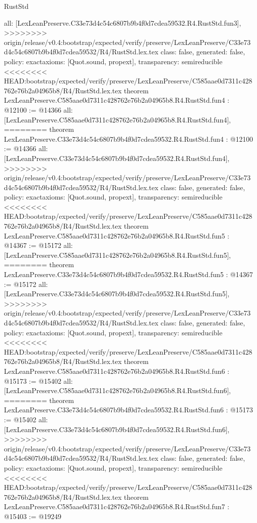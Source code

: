 \begin{lexlean}{RustStd}
\begin{coremodule}
{\begin{coremodule}
{{{{{{{  all: [LexLeanPreserve.C33e73d4c54c6807b9b4f0d7cdea59532.R4.RustStd.fun3],
>>>>>>>> origin/release/v0.4:bootstrap/expected/verify/preserve/LexLeanPreserve/C33e73d4c54c6807b9b4f0d7cdea59532/R4/RustStd.lex.tex
  class: false,
  generated: false,
  policy: exact{axioms: [Quot.sound, propext]},
  transparency: semireducible
}
<<<<<<<< HEAD:bootstrap/expected/verify/preserve/LexLeanPreserve/C585aae0d7311c428762e76b2a04965b8/R4/RustStd.lex.tex
theorem LexLeanPreserve.C585aae0d7311c428762e76b2a04965b8.R4.RustStd.fun4 : @12100 := @14366 {
  all: [LexLeanPreserve.C585aae0d7311c428762e76b2a04965b8.R4.RustStd.fun4],
========
theorem LexLeanPreserve.C33e73d4c54c6807b9b4f0d7cdea59532.R4.RustStd.fun4 : @12100 := @14366 {
  all: [LexLeanPreserve.C33e73d4c54c6807b9b4f0d7cdea59532.R4.RustStd.fun4],
>>>>>>>> origin/release/v0.4:bootstrap/expected/verify/preserve/LexLeanPreserve/C33e73d4c54c6807b9b4f0d7cdea59532/R4/RustStd.lex.tex
  class: false,
  generated: false,
  policy: exact{axioms: [Quot.sound, propext]},
  transparency: semireducible
}
<<<<<<<< HEAD:bootstrap/expected/verify/preserve/LexLeanPreserve/C585aae0d7311c428762e76b2a04965b8/R4/RustStd.lex.tex
theorem LexLeanPreserve.C585aae0d7311c428762e76b2a04965b8.R4.RustStd.fun5 : @14367 := @15172 {
  all: [LexLeanPreserve.C585aae0d7311c428762e76b2a04965b8.R4.RustStd.fun5],
========
theorem LexLeanPreserve.C33e73d4c54c6807b9b4f0d7cdea59532.R4.RustStd.fun5 : @14367 := @15172 {
  all: [LexLeanPreserve.C33e73d4c54c6807b9b4f0d7cdea59532.R4.RustStd.fun5],
>>>>>>>> origin/release/v0.4:bootstrap/expected/verify/preserve/LexLeanPreserve/C33e73d4c54c6807b9b4f0d7cdea59532/R4/RustStd.lex.tex
  class: false,
  generated: false,
  policy: exact{axioms: [Quot.sound, propext]},
  transparency: semireducible
}
<<<<<<<< HEAD:bootstrap/expected/verify/preserve/LexLeanPreserve/C585aae0d7311c428762e76b2a04965b8/R4/RustStd.lex.tex
theorem LexLeanPreserve.C585aae0d7311c428762e76b2a04965b8.R4.RustStd.fun6 : @15173 := @15402 {
  all: [LexLeanPreserve.C585aae0d7311c428762e76b2a04965b8.R4.RustStd.fun6],
========
theorem LexLeanPreserve.C33e73d4c54c6807b9b4f0d7cdea59532.R4.RustStd.fun6 : @15173 := @15402 {
  all: [LexLeanPreserve.C33e73d4c54c6807b9b4f0d7cdea59532.R4.RustStd.fun6],
>>>>>>>> origin/release/v0.4:bootstrap/expected/verify/preserve/LexLeanPreserve/C33e73d4c54c6807b9b4f0d7cdea59532/R4/RustStd.lex.tex
  class: false,
  generated: false,
  policy: exact{axioms: [Quot.sound, propext]},
  transparency: semireducible
}
<<<<<<<< HEAD:bootstrap/expected/verify/preserve/LexLeanPreserve/C585aae0d7311c428762e76b2a04965b8/R4/RustStd.lex.tex
theorem LexLeanPreserve.C585aae0d7311c428762e76b2a04965b8.R4.RustStd.fun7 : @15403 := @19249 {
}}}}}}}}}}
\end{coremodule}}
\end{coremodule}
\end{lexlean}
